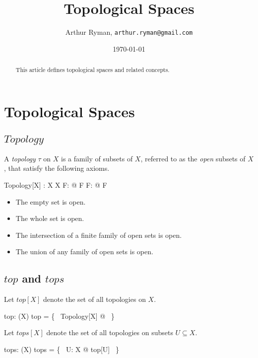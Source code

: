 \documentclass[11pt, oneside]{article}
\title{Topological Spaces}
\author{Arthur Ryman, {\tt arthur.ryman@gmail.com}}
\date{\today}
\begin{document}
\maketitle

\begin{abstract}
This article defines topological spaces and related concepts.
\end{abstract}

\section{Topological Spaces}

\subsection{$Topology$}

A {\it topology} $\tau$ on $X$ is a family of subsets of $X$, referred to as the {\it open} subsets of $X$, that satisfy the following axioms.

\begin{schema}{Topology}[X]
	\tau: \family X
\where
	\emptyset \in \tau
\also
	X \in \tau
\also
	\forall F: \finset \tau @ \bigcap F \in \tau
\also
	\forall F: \power \tau @ \bigcup F \in \tau
\end{schema}

\begin{itemize}
\item The empty set is open.
\item The whole set is open.
\item The intersection of a finite family of open sets is open.
\item The union of any family of open sets is open. 
\end{itemize}

\subsection{$top$ and $tops$}

Let $top[X]$ denote the set of all topologies on $X$.

\begin{gendef}[X]
	top: \power(\family X)
\where
	top = \{~ Topology[X] @ \tau ~\}
\end{gendef}

Let $tops[X]$ denote the set of all topologies on subsets $U \subseteq X$.

\begin{gendef}[X]
	tops: \power(\family X)
\where
	tops = \bigcup \{~ U: \power X @ top[U] ~\}
\end{gendef}
\end{document}
